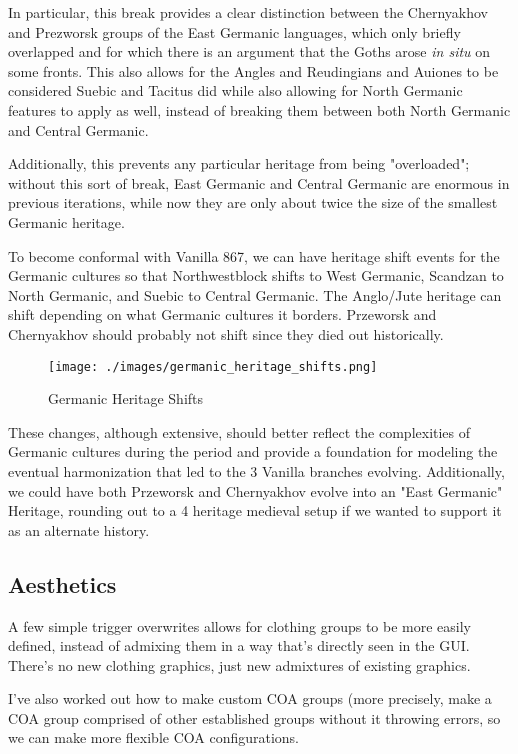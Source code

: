 \documentclass{article}
\begin{document}
	In particular, this break provides a clear distinction between the Chernyakhov and Prezworsk groups of the East Germanic languages, which only briefly overlapped and for which there is an argument that the Goths arose \textit{in situ} on some fronts.
	This also allows for the Angles and Reudingians and Auiones to be considered Suebic and Tacitus did while also allowing for North Germanic features to apply as well, instead of breaking them between both North Germanic and Central Germanic.
	
	Additionally, this prevents any particular heritage from being "overloaded"; without this sort of break, East Germanic and Central Germanic are enormous in previous iterations, while now they are only about twice the size of the smallest Germanic heritage.
	
	To become conformal with Vanilla 867, we can have heritage shift events for the Germanic cultures so that Northwestblock shifts to West Germanic, Scandzan to North Germanic, and Suebic to Central Germanic.
	The Anglo/Jute heritage can shift depending on what Germanic cultures it borders.
	Przeworsk and Chernyakhov should probably not shift since they died out historically.
	
	\begin{figure}[h!]
		\centering
		\texttt{[image: ./images/germanic\_heritage\_shifts.png]}
		\caption{Germanic Heritage Shifts}
	\end{figure}
	
	These changes, although extensive, should better reflect the complexities of Germanic cultures during the period and provide a foundation for modeling the eventual harmonization that led to the 3 Vanilla branches evolving.
	Additionally, we could have both Przeworsk and Chernyakhov evolve into an "East Germanic" Heritage, rounding out to a 4 heritage medieval setup if we wanted to support it as an alternate history. 
	
	\subsection{Aesthetics}
	\label{sec:culture_review:subsec:aesthetics}
	A few simple trigger overwrites allows for clothing groups to be more easily defined, instead of admixing them in a way that’s directly seen in the GUI. There’s no new clothing graphics, just new admixtures of existing graphics.
	
	I’ve also worked out how to make custom COA groups (more precisely, make a COA group comprised of other established groups without it throwing errors, so we can make more flexible COA configurations.
	
\end{document}
